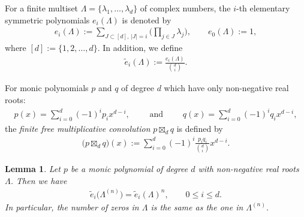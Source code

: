 \documentclass[10pt,a4paper]{article}
\numberwithin{equation}{section}
\newtheorem{Lemma}[Theorem]{Lemma}
\begin{document}
For a finite multiset $\Lambda=\{\lambda_1,\dots, \lambda_d\}$ of complex numbers, the $i$-th elementary symmetric polynomials $e_i(\Lambda)$ is denoted by
\begin{align*}
e_i(\Lambda):= \sum_{J \subset [d],\, |J|=i} \bigg( \prod_{j \in J} \lambda_j \bigg), \qquad e_0(\Lambda):=1,
\end{align*}
where $[d]:=\{1,2,\dots, d\}$.
In addition, we define
\begin{align*}
\widetilde{e}_i(\Lambda):=\frac{e_i(\Lambda)}{\binom{d}{i}}.
\end{align*}

\begin{Definition}\label{defn}
For monic polynomials $p$ and $q$ of degree $d$ which have only non-negative real roots:
\begin{align*}
p(x)=\sum_{i=0}^d (-1)^i p_ix^{d-i}, \qquad \text{ and } \qquad q(x)=\sum_{i=0}^d (-1)^i q_ix^{d-i},
\end{align*}
the {\it finite free multiplicative convolution} $p\boxtimes_d q$ is defined by
\begin{align*}
\big(p\boxtimes_d q\big) (x):= \sum_{i=0}^d(-1)^i \frac{p_iq_i}{\binom{d}{i}} x^{d-i}.
\end{align*}
\end{Definition}

\begin{Lemma}\label{lem:free_multiplicative_polynomial}
Let $p$ be a monic polynomial of degree $d$ with non-negative real roots $\Lambda$. Then we have
\begin{align} \label{eq:symm_root}
\widetilde{e}_{i}\big(\Lambda^{(n)}\big)= \widetilde{e}_{i}(\Lambda)^n, \qquad 0\le i \le d.
\end{align}
In particular, the number of zeros in $\Lambda$ is the same as the one in $\Lambda^{(n)}$.
\end{Lemma}
\end{document}
